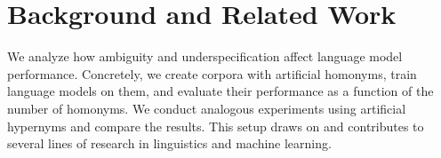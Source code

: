 \documentclass[final]{clv2025}
\begin{document}

\section{Background and Related Work}\label{sec:related}
We analyze how ambiguity and underspecification affect language model performance. Concretely, we create corpora with artificial homonyms, train language models on them, and evaluate their performance as a function of the number of homonyms. We conduct analogous experiments using artificial hypernyms and compare the results. This setup draws on and contributes to several lines of research in linguistics and machine learning.
\end{document}
